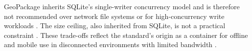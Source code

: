 GeoPackage inherits SQLite's single-writer concurrency model and is therefore not recommended over network file systems or for high-concurrency write workloads \parencite{sqlite2024_appropriate_uses}. The size ceiling, also inherited from SQLite, is not a practical constraint \parencite{ogc2024_geopackage_encoding_standard_140}. These trade-offs reflect the standard's origin as a container for offline and mobile use in disconnected environments with limited bandwidth \parencite{ogc2024_geopackage_encoding_standard_140}.




